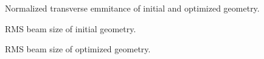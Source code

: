 \begin{center}
\begin{figure}[H]
   \begin{subfigure}{0.4\textwidth}
      
   \end{subfigure}
   \qquad \qquad \qquad
   \begin{subfigure}{0.4\textwidth}
      
   \end{subfigure}
   \caption{Normalized transverse emmitance of initial and optimized geometry.}
   \label{fig:res_eps}
\end{figure}
\end{center}

\newpage

\begin{center}
\begin{figure}[H]
   \begin{subfigure}{0.4\textwidth}
      
   \end{subfigure}
   \qquad \qquad \qquad
   \begin{subfigure}{0.4\textwidth}
      
   \end{subfigure}
   \caption{RMS beam size of initial geometry.}
   \label{fig:res_init}
\end{figure}
\end{center}

\begin{center}
\begin{figure}[H]
   \begin{subfigure}{0.4\textwidth}
      
   \end{subfigure}
   \qquad \qquad \qquad
   \begin{subfigure}{0.4\textwidth}
      
   \end{subfigure}
   \caption{RMS beam size of optimized geometry.}
   \label{fig:res_opt}
\end{figure}
\end{center}
